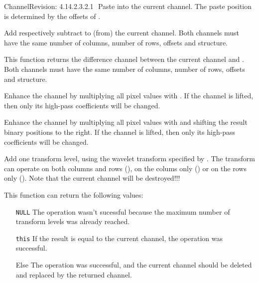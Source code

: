 \begin{manpage}{\libtitle}{Channel}{$ $Revision: 4.14.2.3.2.1 $ $}
    Paste  into the current channel. The paste position is
    determined by the offsets of .

    Add respectively subtract  to (from) the current channel.
    Both channels must have the same number of columns, number of rows,
    offsets and structure.

    This function returns the difference channel between the current channel
    and . Both channels must have the same number of columns,
    number of rows, offsets and structure.

    Enhance the channel by multiplying all pixel values with .
    If the channel is lifted, then only its high-pass coefficients will
    be changed.

    Enhance the channel by multiplying all pixel values with  and
    shifting the result  binary positions to the right.
    If the channel is lifted, then only its high-pass coefficients will
    be changed.

    Add one transform level, using the wavelet transform specified by
    . The transform can operate on both columns and rows
    (), on the colums only () or on the
    rows only (). Note that the current channel will be
    destroyed!!!

    This function can return the following values:
    \begin{itemize}
    \item[\texttt{NULL}] The operation wasn't sucessful because the maximum
    number of transform levels was already reached.
    \item[\texttt{this}] If the result is equal to the current channel, the
    operation was successful.
    \item[Else] The operation was successful, and the current channel
    should be deleted and replaced by the returned channel.
    \end{itemize}


\end{manpage}
